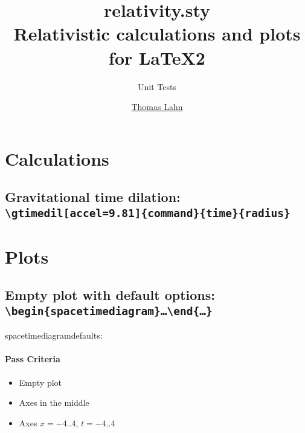 \documentclass[pagesize,headsepline,parskip=half]{scrartcl}
\begin{document}
  \begin{titlepage}
    \title{relativity.sty\\Relativistic calculations and plots\\for \LaTeX2\varepsilon}
    \subtitle{Unit Tests}
    \author{\href{http://PointedEars.de/}{Thomas Lahn}}
    \maketitle
  \end{titlepage}

  \clearpage
  \begin{spacing}{1}
    \tableofcontents
    \thispagestyle{empty}
  \end{spacing}

  \clearpage

  \section{Calculations}
    \subsection{Gravitational time dilation:
      \texttt{\textbackslash{}gtimedil[accel=9.81]\{command\}\{time\}\{radius\}}}
        \dill

  \section{Plots}
    \subsection{Empty plot with default options:
        \texttt{\textbackslash{}begin\{spacetimediagram\}…\textbackslash{}end\{…\}}}
      \begin{spacetimediagram}[
        xmin=-4,
        xmax=4,
        ymin=-4,
        ymax=4
      ]
      \end{spacetimediagram}

      spacetimediagramdefaults:\\
      \spacetimediagramdefaults{}

      \paragraph{Pass Criteria}
        \begin{itemize}
          \item Empty plot
          \item Axes in the middle
          \item Axes $x = -4..4$, $t = -4..4$
        \end{itemize}
\end{document}
